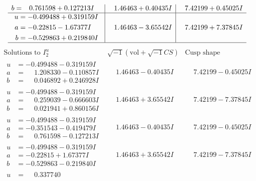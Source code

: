 \documentclass[1p]{elsarticle_modified}
\theoremstyle{definition}
\newcommand{\I}{\sqrt{-1}}
\begin{document}
$$\begin{array}{c|c|c}
\begin{aligned}
b &= \phantom{-}0.761598 + 0.127213 I\end{aligned}
 & \phantom{-}1.46463 + 0.40435 I & \phantom{-}7.42199 + 0.45025 I \\ \hline\begin{aligned}
u &= -0.499488 + 0.319159 I \\
a &= -0.22815 - 1.67377 I \\
b &= -0.529863 + 0.219840 I\end{aligned}
 & \phantom{-}1.46463 - 3.65542 I & \phantom{-}7.42199 + 7.37845 I\\
 \hline 
 \end{array}$$\newpage$$\begin{array}{c|c|c}  
\text{Solutions to }I^u_{2}& \I (\text{vol} + \sqrt{-1}CS) & \text{Cusp shape}\\
 \hline 
\begin{aligned}
u &= -0.499488 - 0.319159 I \\
a &= \phantom{-}1.208330 - 0.110857 I \\
b &= \phantom{-}0.046892 + 0.246928 I\end{aligned}
 & \phantom{-}1.46463 - 0.40435 I & \phantom{-}7.42199 - 0.45025 I \\ \hline\begin{aligned}
u &= -0.499488 - 0.319159 I \\
a &= \phantom{-}0.259039 - 0.666603 I \\
b &= \phantom{-}0.021941 + 0.860156 I\end{aligned}
 & \phantom{-}1.46463 + 3.65542 I & \phantom{-}7.42199 - 7.37845 I \\ \hline\begin{aligned}
u &= -0.499488 - 0.319159 I \\
a &= -0.351543 - 0.419479 I \\
b &= \phantom{-}0.761598 - 0.127213 I\end{aligned}
 & \phantom{-}1.46463 - 0.40435 I & \phantom{-}7.42199 - 0.45025 I \\ \hline\begin{aligned}
u &= -0.499488 - 0.319159 I \\
a &= -0.22815 + 1.67377 I \\
b &= -0.529863 - 0.219840 I\end{aligned}
 & \phantom{-}1.46463 + 3.65542 I & \phantom{-}7.42199 - 7.37845 I \\ \hline\begin{aligned}
u &= \phantom{-}0.337740\phantom{ +0.000000I} \\

\end{aligned}
\end{array}$$
\end{document}
